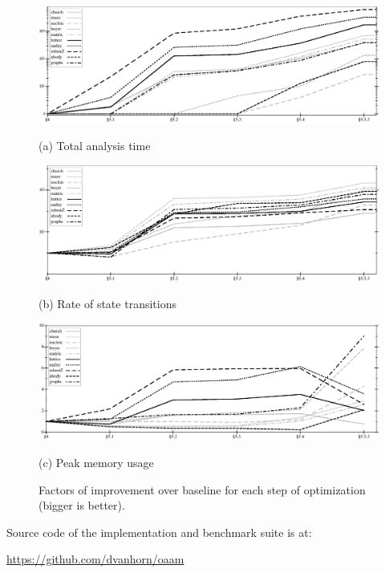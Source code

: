 \documentclass[preprint,onecolumn,9pt]{sigplanconf} %
\begin{document}
\begin{figure}
\begin{center}
  \includegraphics[width=6.5in]{all-relative-time}

  (a) Total analysis time

  \vspace{1em}
  \includegraphics[width=6.5in]{all-relative-speed}

  (b) Rate of state transitions

  \vspace{1em}
  \includegraphics[width=6.5in]{all-relative-space}

  (c) Peak memory usage
\end{center}
\caption{Factors of improvement over baseline for each step of
  optimization (bigger is better).}
\label{fig:bench-all}
\end{figure}

Source code of the implementation and benchmark suite is at:

\begin{center}
\url{https://github.com/dvanhorn/oaam}
\end{center}
\end{document}
